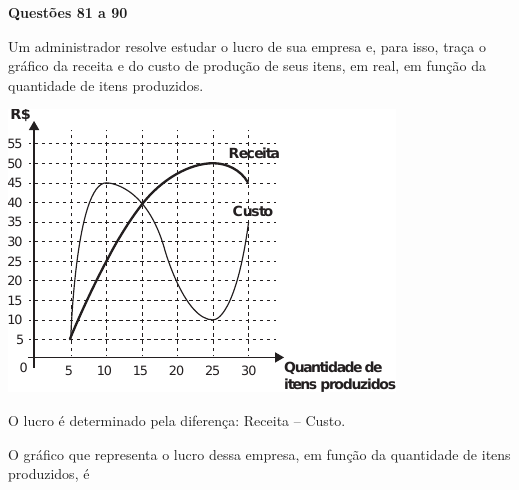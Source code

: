 \onecolumn
{}

\noindent\textbf{Questões 81 a 90} %

\questao %
Um administrador resolve estudar o lucro de sua empresa e, para isso, traça o gráfico da receita 
e do custo de produção de seus itens, em real, em função da quantidade de itens produzidos.

\begin{center}
\includegraphics[width=.4\textwidth]{subareas/matematica/enem_2020-136-grafico.pdf}
\end{center}

O lucro é determinado pela diferença: Receita – Custo.

O gráfico que representa o lucro dessa empresa, em função da quantidade de itens produzidos, é

